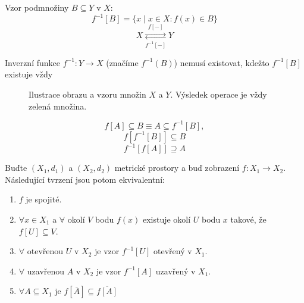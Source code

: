 \documentclass[../main.tex]{subfiles}
\begin{document}
\begin{definition}[Vzor]
	Vzor podmnožiny $B\subseteq Y$ v $X$:
	\[f^{-1}[B] = \{x \mid x \in X: f(x) \in B\}\]
	\[X \underset{f^{-1}[-]}{\stackrel{f[-]}{\rightleftarrows}} Y\]

	Inverzní funkce $f^{-1}:Y \rightarrow X$ (značíme \(f^{-1}(B)\)) nemusí existovat, kdežto $f^{-1}[B]$ existuje vždy
\end{definition}

\begin{figure}[h]
	\centering
	\hspace{4em}
	\caption{Ilustrace obrazu a vzoru množin \(X\) a \(Y\). Výsledek operace je vždy zelená množina.}%
\end{figure}

\begin{lemma}
	\[f[A] \subseteq B \equiv A \subseteq f^{-1}[B],\]
	\[f[f^{-1}[B]] \subseteq B\]
	\[f^{-1}[f[A]] \supseteq A\]
\end{lemma}

\begin{theorem}
	Buďte $(X_1, d_1)$ a $(X_2, d_2)$ metrické prostory a buď zobrazení $f: X_1 \to X_2$. Následující tvrzení
	jsou potom ekvivalentní:
	\begin{enumerate}
	    \item $f$ je spojité.
	    \item $\forall x \in X_1$ a $\forall$ okolí $V$ bodu $f(x)$ existuje okolí $U$ bodu $x$ takové, že
	        $f[U] \subseteq V$.
	    \item $\forall$ otevřenou $U$ v $X_2$ je vzor $f^{-1}[U]$ otevřený v $X_1$.
	    \item $\forall$ uzavřenou $A$ v $X_2$ je vzor $f^{-1}[A]$ uzavřený v $X_1$.
	    \item $\forall A \subseteq X_1$ je $f[\overline{A}] \subseteq \overline{f[A]}$
	\end{enumerate}
\end{theorem}
\end{document}
